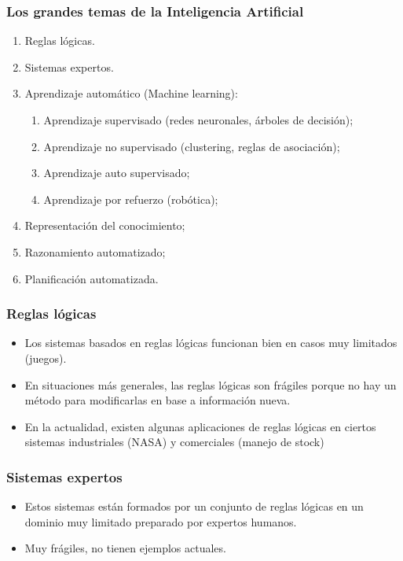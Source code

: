 \documentclass[11pt]{beamer}
\begin{document}
    \begin{frame}
    	\frametitle{Los grandes temas de la Inteligencia Artificial}
    	
    	\begin{enumerate}
    		\item Reglas lógicas.
    		\item Sistemas expertos.
    		\item Aprendizaje automático (Machine learning):
    		\begin{enumerate}
    			\item Aprendizaje supervisado (redes neuronales, árboles de decisión);
    			\item Aprendizaje no supervisado (clustering, reglas de asociación);
    			\item Aprendizaje auto supervisado; 
    			\item Aprendizaje por refuerzo (robótica);
    		\end{enumerate}
    	    \item Representación del conocimiento;
    	    \item Razonamiento automatizado;
    	    \item Planificación automatizada.
    	\end{enumerate}
    \end{frame}

    \begin{frame}
    	\frametitle{Reglas lógicas}
    	
    	\begin{itemize}
    		\item Los sistemas basados en reglas lógicas funcionan bien en casos muy limitados (juegos).
    		\item En situaciones más generales, las reglas lógicas son frágiles porque no hay un método para modificarlas en base a información nueva.
    		\item En la actualidad, existen algunas aplicaciones de reglas lógicas en ciertos sistemas industriales (NASA) y comerciales (manejo de stock)
    	\end{itemize}
    \end{frame}

    \begin{frame}
    	\frametitle{Sistemas expertos}
    	
    	\begin{itemize}
    		\item Estos sistemas están formados por un conjunto de reglas lógicas en un dominio muy limitado preparado por expertos humanos.
    		\item Muy frágiles, no tienen ejemplos actuales.
    	\end{itemize}
    \end{frame}
\end{document}
